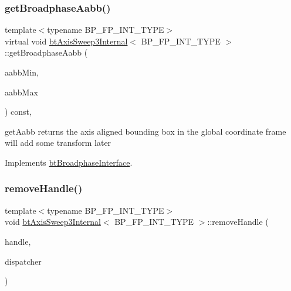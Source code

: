 \subsubsection{\texorpdfstring{get\+Broadphase\+Aabb()}{getBroadphaseAabb()}\hspace{0.1cm}{\footnotesize\ttfamily [2/2]}}
{\footnotesize\ttfamily template$<$typename B\+P\+\_\+\+F\+P\+\_\+\+I\+N\+T\+\_\+\+T\+Y\+PE$>$ \\
virtual void \hyperlink{classbtAxisSweep3Internal}{bt\+Axis\+Sweep3\+Internal}$<$ B\+P\+\_\+\+F\+P\+\_\+\+I\+N\+T\+\_\+\+T\+Y\+PE $>$\+::get\+Broadphase\+Aabb (\begin{DoxyParamCaption}\item[{bt\+Vector3 \&}]{aabb\+Min,  }\item[{bt\+Vector3 \&}]{aabb\+Max }\end{DoxyParamCaption}) const\hspace{0.3cm}{\ttfamily [inline]}, {\ttfamily [virtual]}}

get\+Aabb returns the axis aligned bounding box in the \textquotesingle{}global\textquotesingle{} coordinate frame will add some transform later 

Implements \hyperlink{classbtBroadphaseInterface_ab5af9e26414f5a72a76040b8fab4d9e2}{bt\+Broadphase\+Interface}.

\mbox{\label{classbtAxisSweep3Internal_a4e26f4f8acf63f26451f6396223001bb}} 
\subsubsection{\texorpdfstring{remove\+Handle()}{removeHandle()}}
{\footnotesize\ttfamily template$<$typename B\+P\+\_\+\+F\+P\+\_\+\+I\+N\+T\+\_\+\+T\+Y\+PE$>$ \\
void \hyperlink{classbtAxisSweep3Internal}{bt\+Axis\+Sweep3\+Internal}$<$ B\+P\+\_\+\+F\+P\+\_\+\+I\+N\+T\+\_\+\+T\+Y\+PE $>$\+::remove\+Handle (\begin{DoxyParamCaption}\item[{B\+P\+\_\+\+F\+P\+\_\+\+I\+N\+T\+\_\+\+T\+Y\+PE}]{handle,  }\item[{\hyperlink{classbtDispatcher}{bt\+Dispatcher} $\ast$}]{dispatcher }\end{DoxyParamCaption})}

